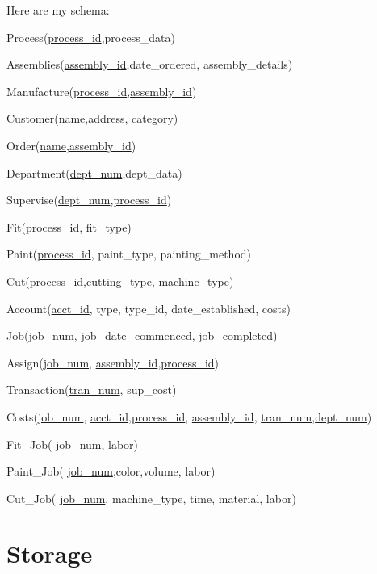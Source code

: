 \documentclass[11pt]{article}
\begin{document}
\indent Here are my schema:

Process(\underline{process\_id},process\_data)

Assemblies(\underline{assembly\_id},date\_ordered, assembly\_details)

Manufacture(\underline{process\_id},\underline{assembly\_id})

Customer(\underline{name},address, category)

Order(\underline{name},\underline{assembly\_id})

Department(\underline{dept\_num},dept\_data)

Supervise(\underline{dept\_num},\underline{process\_id})

Fit(\underline{process\_id}, fit\_type)

Paint(\underline{process\_id}, paint\_type, painting\_method)

Cut(\underline{process\_id},cutting\_type, machine\_type)


Account(\underline{acct\_id}, type, type\_id, date\_established, costs)

Job(\underline{job\_num}, job\_date\_commenced, job\_completed)

Assign(\underline{job\_num}, \underline{assembly\_id},\underline{process\_id})

Transaction(\underline{tran\_num}, sup\_cost)

Costs(\underline{job\_num}, \underline{acct\_id},\underline{process\_id}, \underline{assembly\_id}, \underline{tran\_num},\underline{dept\_num})

Fit\_Job( \underline{job\_num}, labor)

Paint\_Job( \underline{job\_num},color,volume, labor)

Cut\_Job( \underline{job\_num}, machine\_type, time, material, labor)

\newpage
\section{Storage}
\end{document}
